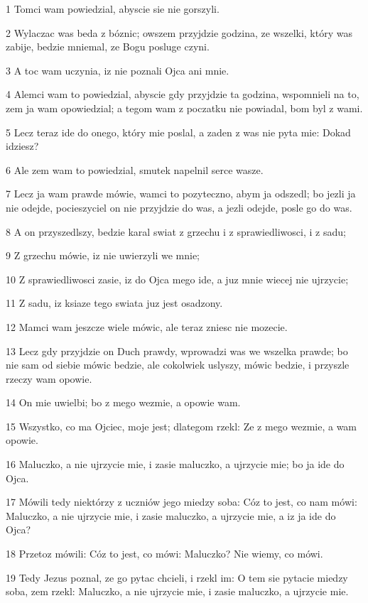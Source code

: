 \par 1 Tomci wam powiedzial, abyscie sie nie gorszyli.
\par 2 Wylaczac was beda z bóznic; owszem przyjdzie godzina, ze wszelki, który was zabije, bedzie mniemal, ze Bogu posluge czyni.
\par 3 A toc wam uczynia, iz nie poznali Ojca ani mnie.
\par 4 Alemci wam to powiedzial, abyscie gdy przyjdzie ta godzina, wspomnieli na to, zem ja wam opowiedzial; a tegom wam z poczatku nie powiadal, bom byl z wami.
\par 5 Lecz teraz ide do onego, który mie poslal, a zaden z was nie pyta mie: Dokad idziesz?
\par 6 Ale zem wam to powiedzial, smutek napelnil serce wasze.
\par 7 Lecz ja wam prawde mówie, wamci to pozyteczno, abym ja odszedl; bo jezli ja nie odejde, pocieszyciel on nie przyjdzie do was, a jezli odejde, posle go do was.
\par 8 A on przyszedlszy, bedzie karal swiat z grzechu i z sprawiedliwosci, i z sadu;
\par 9 Z grzechu mówie, iz nie uwierzyli we mnie;
\par 10 Z sprawiedliwosci zasie, iz do Ojca mego ide, a juz mnie wiecej nie ujrzycie;
\par 11 Z sadu, iz ksiaze tego swiata juz jest osadzony.
\par 12 Mamci wam jeszcze wiele mówic, ale teraz zniesc nie mozecie.
\par 13 Lecz gdy przyjdzie on Duch prawdy, wprowadzi was we wszelka prawde; bo nie sam od siebie mówic bedzie, ale cokolwiek uslyszy, mówic bedzie, i przyszle rzeczy wam opowie.
\par 14 On mie uwielbi; bo z mego wezmie, a opowie wam.
\par 15 Wszystko, co ma Ojciec, moje jest; dlategom rzekl: Ze z mego wezmie, a wam opowie.
\par 16 Maluczko, a nie ujrzycie mie, i zasie maluczko, a ujrzycie mie; bo ja ide do Ojca.
\par 17 Mówili tedy niektórzy z uczniów jego miedzy soba: Cóz to jest, co nam mówi: Maluczko, a nie ujrzycie mie, i zasie maluczko, a ujrzycie mie, a iz ja ide do Ojca?
\par 18 Przetoz mówili: Cóz to jest, co mówi: Maluczko? Nie wiemy, co mówi.
\par 19 Tedy Jezus poznal, ze go pytac chcieli, i rzekl im: O tem sie pytacie miedzy soba, zem rzekl: Maluczko, a nie ujrzycie mie, i zasie maluczko, a ujrzycie mie.
